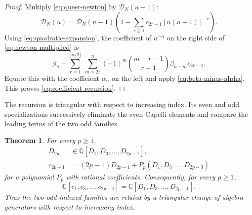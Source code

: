 \documentclass[11pt]{amsart}
\numberwithin{equation}{section}
\newtheorem{theorem}{Theorem}[section]
\theoremstyle{definition}
\theoremstyle{remark}
\newcommand{\C}{\mathbb C}
\newcommand{\Q}{\mathbb Q}
\newcommand{\calD}{\mathcal D}
\begin{document}
\begin{proof}
Multiply \eqref{eq:queer-newton} by \(\calD_N(u-1)\):
\begin{equation}
 \calD_N(u)=\calD_N(u-1)
 \left(1-\sum_{r\geq1}c_{2r-1}[u(u+1)]^{-r}\right).
 \label{eq:newton-multiplied}
\end{equation}
Using \eqref{eq:quadratic-expansion}, the coefficient of \(u^{-n}\)
on the right side of \eqref{eq:newton-multiplied} is
\[
 \beta_n-
 \sum_{r=1}^{\lfloor n/2\rfloor}\ \sum_{m=2r}^{n}
 (-1)^m\binom{m-r-1}{r-1}\beta_{n-m}c_{2r-1}.
\]
Equate this with the coefficient \(\alpha_n\) on the left and apply
\eqref{eq:beta-minus-alpha}.  This proves
\eqref{eq:coefficient-recursion}.
\end{proof}

The recursion is triangular with respect to increasing index.  Its
even and odd specializations successively eliminate the even Capelli
elements and compare the leading terms of the two odd families.

\begin{theorem}
\label{thm:triangularity}
For every \(p\geq1\),
\begin{align}
 D_{2p}&\in\Q[D_1,D_3,\ldots,D_{2p-1}],
 \label{eq:even-D-redundant}\\
 c_{2p-1}&=(2p-1)D_{2p-1}
 +P_p(D_1,D_3,\ldots,D_{2p-3})
 \label{eq:c-D-triangular}
\end{align}
for a polynomial \(P_p\) with rational coefficients.  Consequently,
for every \(p\geq1\),
\begin{equation}
 \C[c_1,c_3,\ldots,c_{2p-1}]
 =\C[D_1,D_3,\ldots,D_{2p-1}].
 \label{eq:finite-subalgebras}
\end{equation}
Thus the two odd-indexed families are related by a triangular change
of algebra generators with respect to increasing index. 
\end{theorem}
\end{document}

